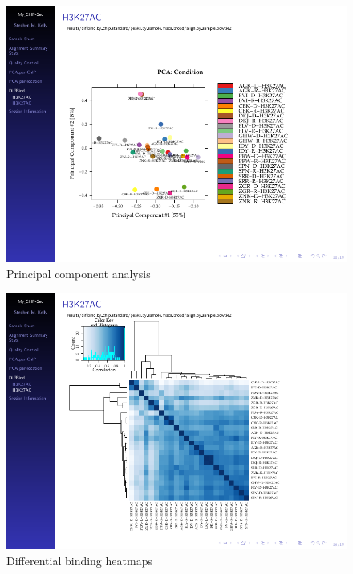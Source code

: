 \documentclass[final]{beamer}
\newlength{\onecolwid}
\newlength{\twocolwid}
\begin{document}
\begin{frame}[t]
\begin{columns}[t]
\begin{column}{\twocolwid}
\begin{columns}[t,totalwidth=\twocolwid]
\begin{column}{\onecolwid}
\begin{beamerboxesrounded}{\phantom{Auto-report Output}}
\begin{figure}
\includegraphics[width=1.0\linewidth, frame]{./Figures/PCA}
\caption{Principal component analysis}

\label{fig:PCA}
\end{figure}

\vspace{10cm}


\begin{figure}
\includegraphics[width=1.0\linewidth, frame]{./Figures/heatmap}
\caption{Differential binding heatmaps}
\label{fig:heatmap}
\end{figure}



\end{beamerboxesrounded}
\end{column}
\end{columns}
\end{column}
\end{columns}
\end{frame}
\end{document}
